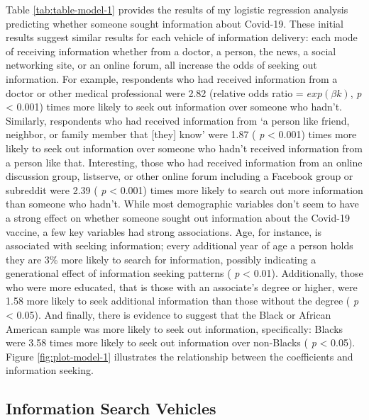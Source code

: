 Table \ref{tab:table-model-1} provides the results of my logistic regression
analysis predicting whether someone sought information about Covid-19. These
initial results suggest similar results for each vehicle of information
delivery: each mode of receiving information whether from a doctor, a person,
the news, a social networking site, or an online forum, all increase the odds of
seeking out information. For example, respondents who had received information
from a doctor or other medical professional were 2.82
(relative odds ratio = \(exp(\beta k)\), \emph{p} \textless{} 0.001) times more likely to seek
out information over someone who hadn't. Similarly, respondents who had received
information from `a person like friend, neighbor, or family member that {[}they{]} know'
were 1.87
( \emph{p} \textless{} 0.001) times more likely to seek out information over someone who hadn't
received information from a person like that. Interesting, those who had
received information from an online discussion group, listserve, or other online
forum including a Facebook group or subreddit were
2.39 ( \emph{p} \textless{} 0.001)
times more likely to search out more information than someone who hadn't. While
most demographic variables don't seem to have a strong effect on whether someone
sought out information about the Covid-19 vaccine, a few key variables had strong
associations. Age, for instance, is associated with seeking information; every
additional year of age a person holds they are
3\%
more likely to search for information, possibly indicating a generational effect
of information seeking patterns ( \emph{p} \textless{} 0.01). Additionally, those who were more
educated, that is those with an associate's degree or higher, were
1.58
more likely to seek additional information than those without the degree
( \emph{p} \textless{} 0.05). And finally, there is evidence to suggest that the Black or
African American sample was more likely to seek out information, specifically:
Blacks were 3.58 times more likely
to seek out information over non-Blacks ( \emph{p} \textless{} 0.05). Figure \ref{fig:plot-model-1} illustrates
the relationship between the coefficients and information seeking.

\hypertarget{information-search-vehicles}{%
\subsection{Information Search Vehicles}\label{information-search-vehicles}}

